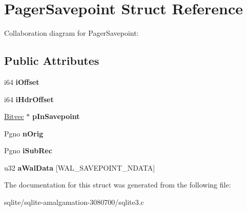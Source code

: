\hypertarget{struct_pager_savepoint}{\section{Pager\+Savepoint Struct Reference}
\label{struct_pager_savepoint}
}


Collaboration diagram for Pager\+Savepoint\+:
\subsection*{Public Attributes}
\begin{DoxyCompactItemize}
\item 
\hypertarget{struct_pager_savepoint_ab3ee7b75a10f47a82c8e3312bee6ad60}{i64 {\bfseries i\+Offset}}\label{struct_pager_savepoint_ab3ee7b75a10f47a82c8e3312bee6ad60}

\item 
\hypertarget{struct_pager_savepoint_ae1afd1cf4fba6f7efd232656366121d1}{i64 {\bfseries i\+Hdr\+Offset}}\label{struct_pager_savepoint_ae1afd1cf4fba6f7efd232656366121d1}

\item 
\hypertarget{struct_pager_savepoint_abf7d6dc9d457c866727f84c4b9e0348f}{\hyperlink{struct_bitvec}{Bitvec} $\ast$ {\bfseries p\+In\+Savepoint}}\label{struct_pager_savepoint_abf7d6dc9d457c866727f84c4b9e0348f}

\item 
\hypertarget{struct_pager_savepoint_a944cca2844a51bdba253476f516b9865}{Pgno {\bfseries n\+Orig}}\label{struct_pager_savepoint_a944cca2844a51bdba253476f516b9865}

\item 
\hypertarget{struct_pager_savepoint_ac1accce313b9da31631892e2cbe85a2f}{Pgno {\bfseries i\+Sub\+Rec}}\label{struct_pager_savepoint_ac1accce313b9da31631892e2cbe85a2f}

\item 
\hypertarget{struct_pager_savepoint_ac96cff844a24378c426a9901517f1d6c}{u32 {\bfseries a\+Wal\+Data} \mbox{[}W\+A\+L\+\_\+\+S\+A\+V\+E\+P\+O\+I\+N\+T\+\_\+\+N\+D\+A\+T\+A\mbox{]}}\label{struct_pager_savepoint_ac96cff844a24378c426a9901517f1d6c}

\end{DoxyCompactItemize}


The documentation for this struct was generated from the following file\+:\begin{DoxyCompactItemize}
\item 
sqlite/sqlite-\/amalgamation-\/3080700/sqlite3.\+c\end{DoxyCompactItemize}
